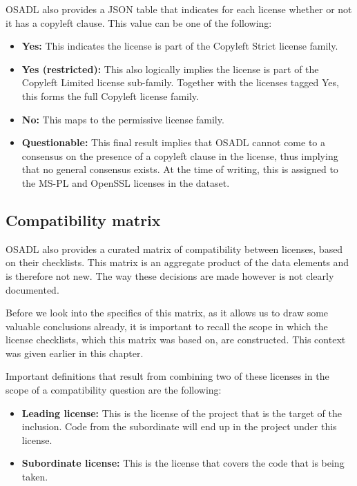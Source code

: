 OSADL also provides a JSON table that indicates for each license whether or not it has a copyleft clause. This value can be one of the following:

\begin{itemize}
	\item \textbf{Yes:} This indicates the license is part of the Copyleft Strict license family.
	\item \textbf{Yes (restricted):} This also logically implies the license is part of the Copyleft Limited license sub-family. Together with the licenses tagged Yes, this forms the full Copyleft license family.
	\item \textbf{No:} This maps to the permissive license family.
	\item \textbf{Questionable:} This final result implies that OSADL cannot come to a consensus on the presence of a copyleft clause in the license, thus implying that no general consensus exists. At the time of writing, this is assigned to the MS-PL and OpenSSL licenses in the dataset.
\end{itemize}

\subsection{Compatibility matrix}

OSADL also provides a curated matrix of compatibility between licenses, based on their checklists. This matrix is an aggregate product of the data elements and is therefore not new. The way these decisions are made however is not clearly documented.

Before we look into the specifics of this matrix, as it allows us to draw some valuable conclusions already, it is important to recall the scope in which the license checklists, which this matrix was based on, are constructed. This context was given earlier in this chapter.

Important definitions that result from combining two of these licenses in the scope of a compatibility question are the following:
\begin{itemize}
	\item \textbf{Leading license:} This is the license of the project that is the target of the inclusion. Code from the subordinate will end up in the project under this license.
	\item \textbf{Subordinate license:} This is the license that covers the code that is being taken.
\end{itemize}

